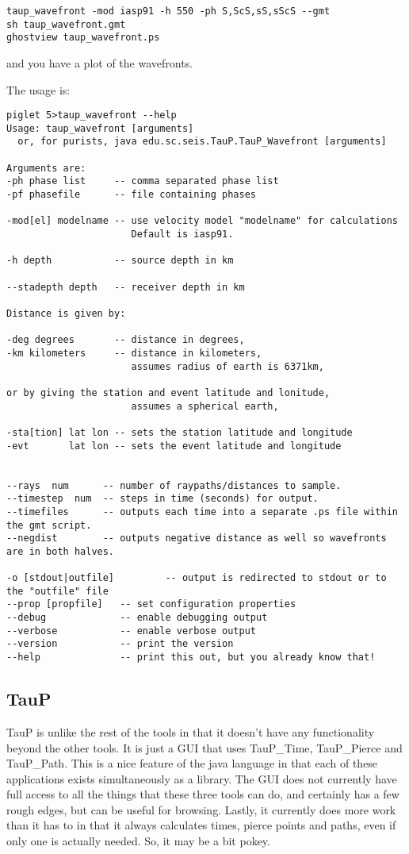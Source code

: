 \begin{verbatim}
taup_wavefront -mod iasp91 -h 550 -ph S,ScS,sS,sScS --gmt
sh taup_wavefront.gmt
ghostview taup_wavefront.ps
\end{verbatim}

and you have a plot of the wavefronts.

The usage is:
\begin{verbatim}
piglet 5>taup_wavefront --help
Usage: taup_wavefront [arguments]
  or, for purists, java edu.sc.seis.TauP.TauP_Wavefront [arguments]

Arguments are:
-ph phase list     -- comma separated phase list
-pf phasefile      -- file containing phases

-mod[el] modelname -- use velocity model "modelname" for calculations
                      Default is iasp91.

-h depth           -- source depth in km

--stadepth depth   -- receiver depth in km

Distance is given by:

-deg degrees       -- distance in degrees,
-km kilometers     -- distance in kilometers,
                      assumes radius of earth is 6371km,

or by giving the station and event latitude and lonitude,
                      assumes a spherical earth,

-sta[tion] lat lon -- sets the station latitude and longitude
-evt       lat lon -- sets the event latitude and longitude


--rays  num      -- number of raypaths/distances to sample.
--timestep  num  -- steps in time (seconds) for output.
--timefiles      -- outputs each time into a separate .ps file within the gmt script.
--negdist        -- outputs negative distance as well so wavefronts are in both halves.

-o [stdout|outfile]         -- output is redirected to stdout or to the "outfile" file
--prop [propfile]   -- set configuration properties
--debug             -- enable debugging output
--verbose           -- enable verbose output
--version           -- print the version
--help              -- print this out, but you already know that!
\end{verbatim} 

\subsection{TauP}
TauP is unlike the rest of the tools in that it doesn't have any functionality
 beyond the other tools. It is just a GUI that uses TauP\_Time, TauP\_Pierce
and TauP\_Path. This is a nice feature of the java language in that each of 
these applications exists simultaneously as a library. The GUI does not 
currently have full access to all the things that these 
three tools can do, and certainly has a few rough edges, but can be useful
for browsing. Lastly, it currently does more work than it has to in that it
always calculates times, pierce points and paths, even if only one is actually
needed. So, it may be a bit pokey.

